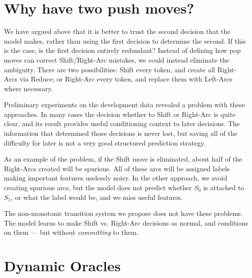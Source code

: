 \documentclass[11pt,letterpaper]{article}
\newcommand{\maybe}[1]{\textcolor{gray}{#1}}
\begin{document}
\section{Why have two push moves?}
\label{sec:shiftless}

We have argued above that it is better to trust the second decision that the model
makes, rather than using the first decision to determine the second. If this is
the case, is the first decision entirely redundant?
Instead of defining how pop moves can correct Shift/Right-Arc mistakes, we could
instead eliminate the ambiguity. There are two possibilities:
Shift every token, and create all Right-Arcs via Reduce; or Right-Arc every token,
and replace them with Left-Arcs where necessary.

Preliminary experiments on the development data revealed a
problem with these approaches. In many cases the decision whether
to Shift or Right-Arc is quite clear, and its result provides useful
conditioning context to later decisions.
The information that determined those decisions
is never lost, but saving all of the difficulty for later
is not a very good structured prediction strategy. 

As an example of the problem, if the Shift move is
eliminated, about half of the Right-Arcs created will be spurious. All of these
arcs will be assigned labels
making important features uselessly noisy. In the other approach, we avoid creating
spurious arcs, but the model does not predict whether $S_0$ is attached to $S_1$,
or what the label would be, and we miss useful features.


The non-monotonic transition system we propose does not have these problems.
The model learns to make Shift vs. Right-Arc decisions as normal, and conditions on them --- but
without \emph{committing} to them.

\section{Dynamic Oracles}
\label{ref:oracle}
\end{document}
